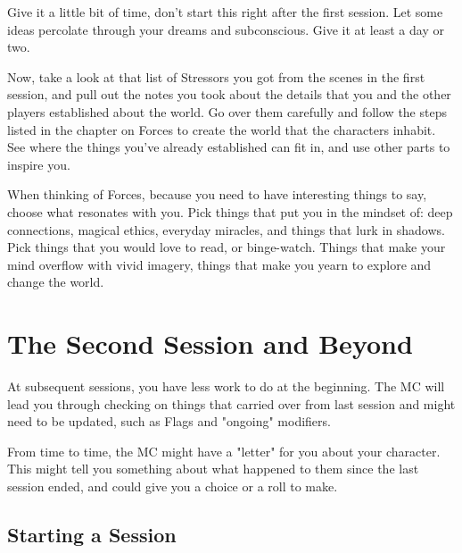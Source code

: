 \documentclass[
  oneside,
  statementpaper,
  9pt]{memoir}
\begin{document}
\begin{MC}

Give it a little bit of time, don’t start this right after the first session. Let some ideas percolate through your dreams and subconscious. Give it at least a day or two.

Now, take a look at that list of Stressors you got from the scenes in the first session, and pull out the notes you took about the details that you and the other players established about the world. Go over them carefully and follow the steps listed in the chapter on Forces to create the world that the characters inhabit. See where the things you’ve already established can fit in, and use other parts to inspire you.

When thinking of Forces, because you need to have interesting things to say, choose what resonates with you. Pick things that put you in the mindset of: deep connections, magical ethics, everyday miracles, and things that lurk in shadows. Pick things that you would love to read, or binge-watch. Things that make your mind overflow with vivid imagery, things that make you yearn to explore and change the world.

\end{MC}

\hypertarget{the-second-session-and-beyond}{%
\section{The Second Session and
Beyond}\label{the-second-session-and-beyond}}

\begin{Player}

At subsequent sessions, you have less work to do at the beginning. The MC will lead you through checking on things that carried over from last session and might need to be updated, such as Flags and "ongoing" modifiers.

From time to time, the MC might have a "letter" for you about your character. This might tell you something about what happened to them since the last session ended, and could give you a choice or a roll to make.

\end{Player}

\hypertarget{starting-a-session-1}{%
\subsection{Starting a Session}\label{starting-a-session-1}}
\end{document}
